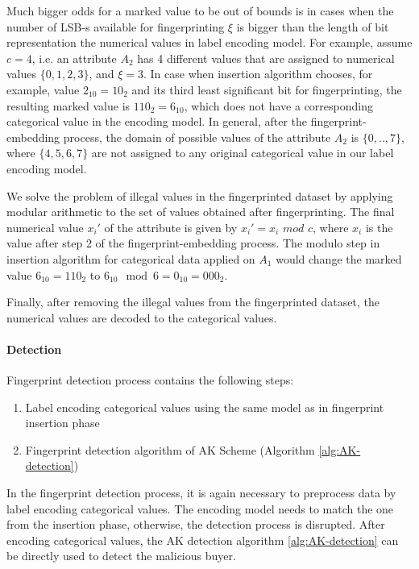 Much bigger odds for a marked value to be out of bounds is in cases when the number of LSB-s available for fingerprinting $\xi$ is bigger than the length of bit representation the numerical values in label encoding model.
For example, assume $c = 4$, i.e. an attribute $A_2$ has 4 different values that are assigned to numerical values $\{0,1,2,3\}$, and $\xi = 3$. 
In case when insertion algorithm chooses, for example, value $2_{10}=10_2$ and its third least significant bit for fingerprinting, the resulting marked value is $110_2 = 6_{10}$, which does not have a corresponding categorical value in the encoding model. 
In general, after the fingerprint-embedding process, the domain of possible values of the attribute $A_2$ is $\{0,..,7\}$, where $\{4,5,6,7\}$ are not assigned to any original categorical value in our label encoding model. 

We solve the problem of illegal values in the fingerprinted dataset by applying modular arithmetic to the set of values obtained after fingerprinting. 
The final numerical value $x_i'$ of the attribute is given by $x_i' = x_i$ $mod$  $c$, where $x_i$ is the value after step 2 of the fingerprint-embedding process.
The modulo step in insertion algorithm for categorical data applied on $A_1$ would change the marked value $6_{10}=110_2$ to $6_{10} \mod 6 = 0_{10} = 000_2$. 

Finally, after removing the illegal values from the fingerprinted dataset, the numerical values are decoded to the categorical values. 

\paragraph{Detection}
Fingerprint detection process contains the following steps:
\begin{enumerate}
    \item Label encoding categorical values using the same model as in fingerprint insertion phase
    \item Fingerprint detection algorithm of AK Scheme (Algorithm \ref{alg:AK-detection})
\end{enumerate}

In the fingerprint detection process, it is again necessary to preprocess data by label encoding categorical values.
The encoding model needs to match the one from the insertion phase, otherwise, the detection process is disrupted.
After encoding categorical values, the AK detection algorithm \ref{alg:AK-detection} can be directly used to detect the malicious buyer.

